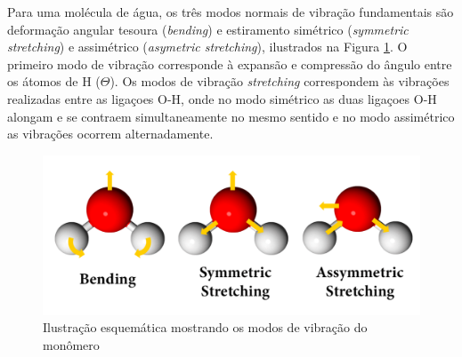  Para uma molécula de água, os três modos normais de vibração fundamentais são deformação angular tesoura (\textit{bending}) e estiramento simétrico (\textit{symmetric stretching}) e assimétrico (\textit{asymetric stretching}), ilustrados na Figura \ref{fig:vibra}. O primeiro modo de vibração corresponde à expansão e compressão do ângulo entre os átomos de H ($ \Theta $). Os modos de vibração \textit{stretching} correspondem às vibrações realizadas entre as ligaçoes O-H, onde no modo simétrico as duas ligaçoes O-H alongam e se contraem simultaneamente no mesmo sentido e no modo assimétrico as vibrações ocorrem alternadamente.
 
 \begin{figure}[H]
	\centering
	\caption{Ilustração esquemática mostrando os modos de vibração do monômero\label{fig:vibra}}
	\includegraphics[scale=0.32]{figs/setas.pdf}
\end{figure}
 
